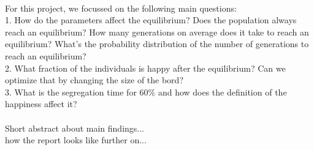 \\
For this project, we focussed on the following main questions:\\
1. How do the parameters affect the equilibrium? Does the population always reach an equilibrium? How many generations on average does it take to reach an equilibrium? What's the probability distribution of the number of generations to reach an equilibrium?\\
2. What fraction of the individuals is happy after the equilibrium? Can we optimize that by changing the size of the bord?\\
3. What is the segregation time for 60$\%$ and how does the definition of the happiness affect it?\\
\\
Short abstract about main findings...\\
how the report looks like further on...
